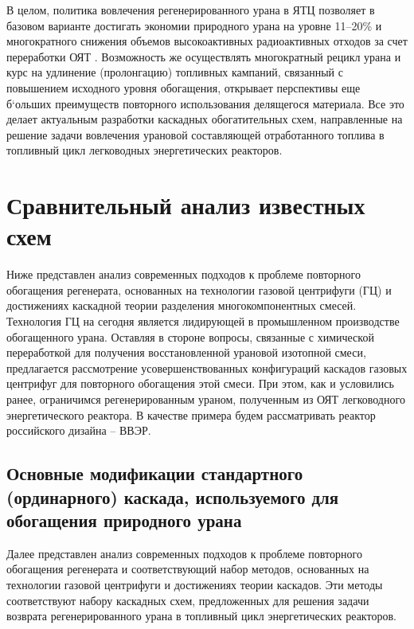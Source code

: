 В целом, политика вовлечения регенерированного урана в ЯТЦ позволяет в базовом варианте достигать экономии природного урана на уровне 11--20\% и многократного снижения объемов высокоактивных радиоактивных отходов за счет переработки ОЯТ \cite{delculAnalysisReuseUranium2009}. Возможность же осуществлять многократный рецикл урана и курс на удлинение (пролонгацию) топливных кампаний, связанный с повышением исходного уровня обогащения, открывает перспективы еще б`ольших преимуществ повторного использования делящегося материала.
Все это делает актуальным разработки каскадных обогатительных схем, направленные на решение задачи вовлечения урановой составляющей отработанного топлива в топливный цикл легководных энергетических реакторов.


\section{Сравнительный анализ известных схем}\label{sec:ch1/sec2}

Ниже представлен анализ современных подходов к проблеме повторного обогащения регенерата, основанных на технологии газовой центрифуги (ГЦ) и достижениях каскадной теории разделения многокомпонентных смесей. Технология ГЦ на сегодня является лидирующей в промышленном производстве обогащенного урана.
Оставляя в стороне вопросы, связанные с химической переработкой для получения восстановленной урановой изотопной смеси, предлагается рассмотрение усовершенствованных конфигураций каскадов газовых центрифуг для повторного обогащения этой смеси. При этом, как и условились ранее, ограничимся регенерированным ураном, полученным из ОЯТ легководного энергетического реактора. В качестве примера будем рассматривать реактор российского дизайна -- ВВЭР.

\subsection{Основные модификации стандартного (ординарного) каскада, используемого для обогащения природного урана}\label{sec:ch1/sec2.1}
Далее представлен анализ современных подходов к проблеме повторного обогащения регенерата и соответствующий набор методов, основанных на технологии газовой центрифуги и достижениях теории каскадов. Эти методы соответствуют набору каскадных схем, предложенных для решения задачи возврата регенерированного урана в топливный цикл энергетических реакторов.

